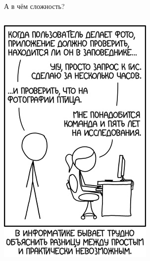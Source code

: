 \documentclass[aspectratio=169, professionalfonts]{beamer}
\begin{document}
\begin{frame}{А в чём сложность?}
\begin{columns}
\begin{column}{.24\linewidth}
            \includegraphics[width=\linewidth]{graphs/fig6_2.jpg}
        \end{column}
    \end{columns}
\end{frame}
\end{document}
